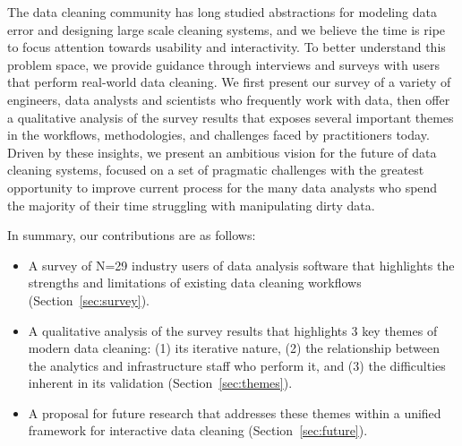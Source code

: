 The data cleaning community has long studied abstractions for modeling data error and designing large scale cleaning systems, and we believe the time is ripe to focus attention towards usability and interactivity.%
To better understand this problem space, we provide guidance through interviews and surveys with users that perform real-world data cleaning. %
We first present our survey of a variety of engineers, data analysts and scientists who frequently work with data, then offer a qualitative analysis of the survey results that exposes several important themes in the workflows, methodologies, and challenges faced by practitioners today.
Driven by these insights, we present an ambitious vision for the future of data cleaning systems, focused on a set of pragmatic challenges with the greatest opportunity to improve current process for the many data analysts who spend the majority of their time struggling with manipulating dirty data.

In summary, our contributions are as follows:
\begin{itemize}
\item A survey of N=29 industry users of data analysis software that highlights the strengths and limitations of existing data cleaning workflows (Section~\ref{sec:survey}).
\item A qualitative analysis of the survey results that highlights 3 key themes of modern data cleaning: (1) its iterative nature, (2) the relationship between the analytics and infrastructure staff who perform it, and (3) the difficulties inherent in its validation (Section~\ref{sec:themes}).
\item A proposal for future research that addresses these themes within a unified framework for interactive data cleaning (Section~\ref{sec:future}).
\end{itemize}
